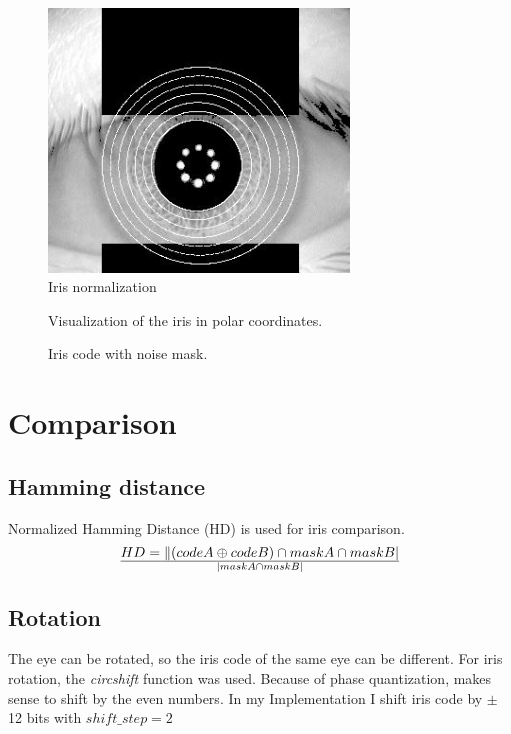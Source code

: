\documentclass{article}
\begin{document}
\begin{figure}[ht!]
  \centering
  \includegraphics[width=80mm]{Resources/iris-normal.jpg}
  \caption{Iris normalization}
  \label{IrisNormal}
\end{figure}

\begin{figure}[ht!]
  \centering
  \def\svgscale{0.7}
  
  \caption{Visualization of the iris in polar coordinates.}
  \label{IrisPolar}
\end{figure}

\begin{figure}[ht!]
  \centering
  \def\svgscale{0.7}
  
  \caption{Iris code with noise mask.}
  \label{IrisCode}
\end{figure}

\newpage

\section{Comparison}

\subsection{Hamming distance}
Normalized Hamming Distance (HD) is used for iris comparison.
\begin{equation}
  HD = \lVert (codeA \oplus codeB) \cap maskA \cap maskB \rvert \over \lvert maskA \cap maskB \rvert
\end{equation}

\subsection{Rotation}
The eye can be rotated, so the iris code of the same eye can be different.
For iris rotation, the \textit{circshift} function was used.
Because of phase quantization, makes sense to shift by the even numbers.
In my Implementation I shift iris code by $\pm$ 12 bits with \(shift\_step = 2\)
\end{document}
